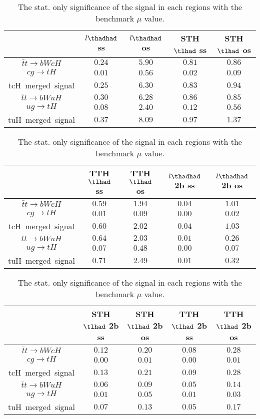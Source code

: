 \begin{table}
\caption{The stat. only significance of the signal in each regions with the benchmark $\mu$ value.}
\centering
\begin{tabular}{|c|c|c|c|c|} \hline
 & $l\thadhad$ ss & $l\thadhad$ os & STH $\tlhad$ ss & STH $\tlhad$ os\\\hline
$\bar{t}t\to bWcH$ & $0.24$ & $5.90$ & $0.81$ & $0.86$\\\hline
$cg\to tH$ & $0.01$ & $0.56$ & $0.02$ & $0.09$\\\hline
tcH~merged~signal & $0.25$ & $6.30$ & $0.83$ & $0.94$\\\hline
$\bar{t}t\to bWuH$ & $0.30$ & $6.28$ & $0.86$ & $0.85$\\\hline
$ug\to tH$ & $0.08$ & $2.40$ & $0.12$ & $0.56$\\\hline
tuH~merged~signal & $0.37$ & $8.09$ & $0.97$ & $1.37$\\\hline
\end{tabular}
\begin{tabular}{|c|c|c|c|c|} \hline
 & TTH $\tlhad$ ss & TTH $\tlhad$ os & $l\thadhad$ 2b ss & $l\thadhad$ 2b os\\\hline
$\bar{t}t\to bWcH$ & $0.59$ & $1.94$ & $0.04$ & $1.01$\\\hline
$cg\to tH$ & $0.01$ & $0.09$ & $0.00$ & $0.02$\\\hline
tcH~merged~signal & $0.60$ & $2.02$ & $0.04$ & $1.03$\\\hline
$\bar{t}t\to bWuH$ & $0.64$ & $2.03$ & $0.01$ & $0.26$\\\hline
$ug\to tH$ & $0.07$ & $0.48$ & $0.00$ & $0.07$\\\hline
tuH~merged~signal & $0.71$ & $2.49$ & $0.01$ & $0.32$\\\hline
\end{tabular}
\begin{tabular}{|c|c|c|c|c|} \hline
 & STH $\tlhad$ 2b ss & STH $\tlhad$ 2b os & TTH $\tlhad$ 2b ss & TTH $\tlhad$ 2b os\\\hline
$\bar{t}t\to bWcH$ & $0.12$ & $0.20$ & $0.08$ & $0.28$\\\hline
$cg\to tH$ & $0.00$ & $0.01$ & $0.00$ & $0.01$\\\hline
tcH~merged~signal & $0.13$ & $0.21$ & $0.09$ & $0.28$\\\hline
$\bar{t}t\to bWuH$ & $0.06$ & $0.09$ & $0.05$ & $0.14$\\\hline
$ug\to tH$ & $0.01$ & $0.05$ & $0.01$ & $0.03$\\\hline
tuH~merged~signal & $0.07$ & $0.13$ & $0.05$ & $0.17$\\\hline
\end{tabular}
\label{tab:significance}
\end{table}

